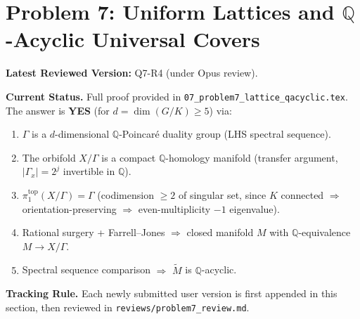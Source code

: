 \section{Problem 7: Uniform Lattices and $\mathbb Q$-Acyclic Universal Covers}

\textbf{Latest Reviewed Version:} Q7-R4 (under Opus review).

\textbf{Current Status.}
Full proof provided in \texttt{07\_problem7\_lattice\_qacyclic.tex}. The answer is \textbf{YES} (for $d=\dim(G/K)\ge 5$) via:
\begin{enumerate}
\item $\Gamma$ is a $d$-dimensional $\mathbb Q$-Poincar\'e duality group (LHS spectral sequence).
\item The orbifold $X/\Gamma$ is a compact $\mathbb Q$-homology manifold (transfer argument, $|\Gamma_x|=2^j$ invertible in $\mathbb Q$).
\item $\pi_1^{\mathrm{top}}(X/\Gamma)=\Gamma$ (codimension $\ge 2$ of singular set, since $K$ connected $\Rightarrow$ orientation-preserving $\Rightarrow$ even-multiplicity $-1$ eigenvalue).
\item Rational surgery + Farrell--Jones $\Rightarrow$ closed manifold $M$ with $\mathbb Q$-equivalence $M\to X/\Gamma$.
\item Spectral sequence comparison $\Rightarrow$ $\widetilde M$ is $\mathbb Q$-acyclic.
\end{enumerate}

\textbf{Tracking Rule.}
Each newly submitted user version is first appended in this section, then reviewed in \texttt{reviews/problem7\_review.md}.
